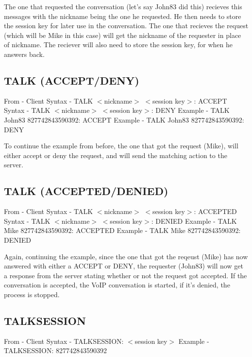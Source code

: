 \documentclass[12pt]{rapport}
\begin{document}
\noindent The one that requested the conversation (let's say John83 did this) recieves this messages with the nickname being the one he requested. He then needs to store the session key for later use in the conversation.\newline
\noindent The one that recieves the request (which will be Mike in this case) will get the nickname of the requester in place of nickname. The reciever will also need to store the session key, for when he answers back.

\subsection*{TALK (ACCEPT/DENY)}
From    - Client\newline
Syntax  - TALK $<$nickname$>$ $<$session key$>$: ACCEPT\newline
Syntax  - TALK $<$nickname$>$ $<$session key$>$: DENY\newline
Example - TALK John83 827742843590392: ACCEPT\newline
Example - TALK John83 827742843590392: DENY\newline

\noindent To continue the example from before, the one that got the request (Mike), will either accept or deny the request, and will send the matching action to the server.

\subsection*{TALK (ACCEPTED/DENIED)}
From    - Client\newline
Syntax  - TALK $<$nickname$>$ $<$session key$>$: ACCEPTED\newline
Syntax  - TALK $<$nickname$>$ $<$session key$>$: DENIED\newline
Example - TALK Mike 827742843590392: ACCEPTED\newline
Example - TALK Mike 827742843590392: DENIED\newline

\noindent Again, continuing the example, since the one that got the reqeust (Mike) has now answered with either a ACCEPT or DENY, the requester (John83) will now get a response from the server stating whether or not the request got accepted. If the conversation is accepted, the VoIP conversation is started, if it's denied, the process is stopped.

\subsection*{TALKSESSION}
From    - Client\newline
Syntax  - TALKSESSION: $<$session key$>$\newline
Example - TALKSESSION: 827742843590392\newline
\end{document}
